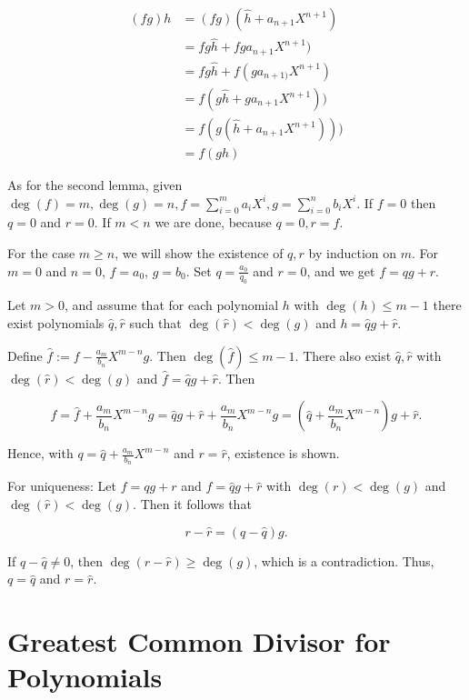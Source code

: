 \begin{align*}
    (fg)h &= (fg)(\hat{h} + a_{n + 1}X^{n + 1}) \\  
          &= fg\hat{h} + fga_{n + 1}X^{n + 1}) \\ 
          &= fg\hat{h} + f(ga_{n + 1)}X^{n + 1}) \\ 
          &= f(g\hat{h} + ga_{n + 1}X^{n + 1})) \\ 
          &= f(g(\hat{h} + a_{n + 1}X^{n + 1}))) \\ 
          &= f(gh)
\end{align*}

\QED 

As for the second lemma, given \(\deg(f) = m, \deg(g) = n, f = \sum_{i = 0}^{m} a_i X^i, g = \sum_{i = 0}^{n} b_i X^i\).
If \(f = 0\) then \(q = 0\) and \(r = 0\). If \(m < n\) we are done, because \(q = 0, r = f\). 

For the case \(m \ge n\), we will show the existence of \(q,r\) by induction on \(m\). For 
\(m = 0\) and \(n = 0\), \(f = a_0\), \(g = b_0\). Set \(q = \frac{a_0}{q_0}\) and \(r = 0\), and we get 
\(f = qg + r\).

Let \(m > 0\), and assume that for each polynomial \(h\) with \(\deg(h) \le m - 1\) there 
exist polynomials \(\hat{q}, \hat{r}\) such that \(\deg(\hat{r}) < \deg(g)\) and 
\(h = \hat{q}g + \hat{r}\).

Define \(\hat{f} := f - \frac{a_m}{b_n}X^{m - n}g\). Then \(\deg(\hat{f}) \le m - 1\). There also 
exist \(\hat{q}, \hat{r}\) with \(\deg(\hat{r}) < \deg(g)\) and \(\hat{f} = \hat{q}g + \hat{r}\). Then 

\[
    f = \hat{f} + \frac{a_m}{b_n} X^{m-n} g
    = \hat{q} g + \hat{r} + \frac{a_m}{b_n} X^{m-n} g
    = \left(\hat{q} + \frac{a_m}{b_n} X^{m-n}\right) g + \hat{r}.
\]

Hence, with \(q = \hat q + \frac{a_m}{b_n} X^{m-n}\) and \(r = \hat{r}\), existence is shown.

For uniqueness: Let \(f = qg + r\) and \(f = \hat{q}g + \hat{r}\)
with \(\deg(r) < \deg(g)\) and \(\deg(\hat{r}) < \deg(g)\). Then it follows that

\[
    r - \hat{r} = (q - \hat{q}) g .
\]

If \(q - \hat{q} \neq 0\), then \(\deg(r - \hat{r}) \ge \deg(g)\),
which is a contradiction. Thus, \(q = \hat{q}\) and \(r = \hat{r}\).

\QED

\section{Greatest Common Divisor for Polynomials}


